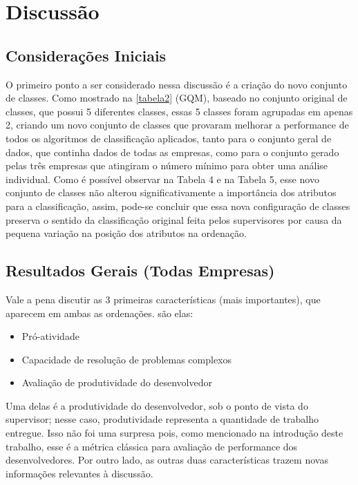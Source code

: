 \chapter[Discussão]{Discussão}

\section{Considerações Iniciais}
O primeiro ponto a ser considerado nessa discussão é a criação do novo conjunto de classes. Como mostrado na \autoref{tabela2} (GQM), baseado no conjunto original de classes, que possui 5 diferentes classes, essas 5 classes foram agrupadas em apenas 2, criando um novo conjunto de classes que provaram melhorar a performance de todos os algoritmos de classificação aplicados, tanto para o conjunto geral de dados, que continha dados de todas as empresas, como para o conjunto gerado pelas três empresas que atingiram o número mínimo para obter uma análise individual. Como é possível observar na Tabela 4 e na Tabela 5, esse novo conjunto de classes não alterou significativamente a importância dos atributos para a classificação, assim, pode-se concluir que essa nova configuração de classes preserva o sentido da classificação original feita pelos supervisores por causa da pequena variação na posição dos atributos na ordenação.

\section{Resultados Gerais (Todas Empresas)}

Vale a pena discutir as 3 primeiras características (mais importantes), que aparecem em ambas as ordenações. são elas:

\begin{itemize}
	\item Pró-atividade
	\item Capacidade de resolução de problemas complexos
	\item Avaliação de produtividade do desenvolvedor
\end{itemize}


Uma delas é a produtividade do desenvolvedor, sob o ponto de vista do supervisor; nesse caso, produtividade representa a quantidade de trabalho entregue. Isso não foi uma surpresa pois, como mencionado na introdução deste trabalho, esse é a métrica clássica para avaliação de performance dos desenvolvedores. Por outro lado, as outras duas características trazem novas informações relevantes à discussão.

